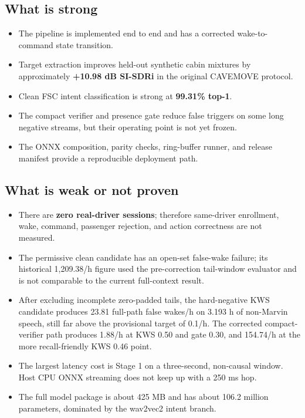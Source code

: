 \documentclass[11pt,a4paper]{article}
\newcommand{\metric}[1]{\textbf{#1}}
\begin{document}
\subsection{What is strong}

\begin{itemize}[leftmargin=*]
  \item The pipeline is implemented end to end and has a corrected wake-to-command state transition.
  \item Target extraction improves held-out synthetic cabin mixtures by approximately
        \metric{+10.98 dB SI-SDRi} in the original CAVEMOVE protocol.
  \item Clean FSC intent classification is strong at \metric{99.31\% top-1}.
  \item The compact verifier and presence gate reduce false triggers on some
        long negative streams, but their operating point is not yet frozen.
  \item The ONNX composition, parity checks, ring-buffer runner, and release
        manifest provide a reproducible deployment path.
\end{itemize}

\subsection{What is weak or not proven}

\begin{itemize}[leftmargin=*]
  \item There are \metric{zero real-driver sessions}; therefore same-driver
        enrollment, wake, command, passenger rejection, and action correctness
        are not measured.
  \item The permissive clean candidate has an open-set false-wake failure;
        its historical 1,209.38/h figure used the pre-correction tail-window
        evaluator and is not comparable to the current full-context result.
  \item After excluding incomplete zero-padded tails, the hard-negative KWS
        candidate produces 23.81 full-path false wakes/h on 3.193 h of
        non-Marvin speech, still far above the provisional target of 0.1/h.
        The corrected compact-verifier path produces 1.88/h at KWS 0.50 and
        gate 0.30, and 154.74/h at the more recall-friendly KWS 0.46 point.
  \item The largest latency cost is Stage 1 on a three-second, non-causal
        window. Host CPU ONNX streaming does not keep up with a 250 ms hop.
  \item The full model package is about 425 MB and has about 106.2 million
        parameters, dominated by the wav2vec2 intent branch.
\end{itemize}
\end{document}
